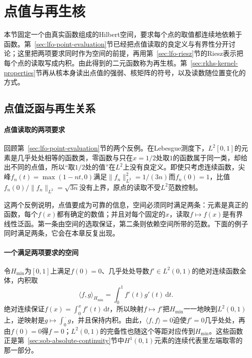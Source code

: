 
\section{点值与再生核}
\label{sec:rkhs-point-evaluation}

本节固定一个由真实函数组成的Hilbert空间，要求每个点的取值都连续地依赖于函数。第~\ref{sec:lfo-point-evaluation}节已经把点值读取的良定义与有界性分开讨论；这里把两项要求同时作为空间的前提，再用第~\ref{sec:lfo-riesz}节的Riesz表示把每个点的读取写成内积。由此得到的二元函数称为再生核。第~\ref{sec:rkhs-kernel-properties}节再从核本身读出点值的强弱、核矩阵的符号，以及读数随位置变化的方式。

\subsection{点值泛函与再生关系}
\label{sec:rkhs-reproducing}
\label{subsubsec:point-evaluation}

\paragraph{点值读取的两项要求}

回顾第~\ref{sec:lfo-point-evaluation}节的两个反例。在Lebesgue测度下，$L^2[0,1]$的元素是几乎处处相等的函数类，零函数与只在$x=1/2$处取$1$的函数属于同一类，却给出不同的点值，所以“取$1/2$处的值”在$L^2$上没有良定义。即使只考虑连续函数，尖峰$f_n(t)=\max(1-nt,0)$满足$\|f_n\|_{L^2}^2=1/(3n)$而$f_n(0)=1$，比值$f_n(0)/\|f_n\|_{L^2}=\sqrt{3n}$没有上界，原点的读取不受$L^2$范数控制。

这两个反例说明，点值要成为可靠的信息，空间必须同时满足两条：元素是真正的函数，每个$f(x)$都有确定的数值；并且对每个固定的$x$，读取$f\mapsto f(x)$是有界线性泛函。第一条由空间的选取保证，第二条则依赖空间所带的范数。下面的例子同时满足两条，它会在本章反复出现。

\paragraph{一个满足两项要求的空间}

令$H_{\min}$为$[0,1]$上满足$f(0)=0$、几乎处处导数$f'\in L^2(0,1)$的绝对连续函数全体，内积取
\[
\langle f,g\rangle_{H_{\min}}=\int_0^1f'(t)g'(t)\,\mathrm dt .
\]
绝对连续保证$f(x)=\int_0^xf'(t)\,\mathrm dt$，所以映射$f\mapsto f'$把$H_{\min}$一一地映到$L^2(0,1)$上，逆映射是$g\mapsto\int_0^{\,\cdot}g$，并且保持内积。由此，$\langle f,f\rangle=0$迫使$f'=0$几乎处处，再由$f(0)=0$得$f=0$；$L^2(0,1)$的完备性也随这个等距对应传到$H_{\min}$。这些函数正是第~\ref{sec:sob-absolute-continuity}节中$H^1(0,1)$元素的连续代表里左端取零的那一部分。

